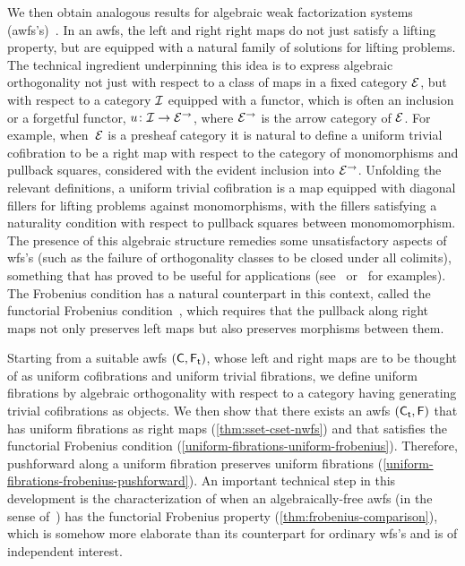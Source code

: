 \documentclass[reqno,10pt,a4paper,oneside,draft]{amsart}
\begin{document}
We then obtain analogous results for algebraic weak factorization systems (awfs's)~\cite{garner:small-object-argument,grandis-tholen-nwfs}.
In an awfs, the left and right right maps do not just satisfy a lifting property, but are equipped with a natural family of solutions for lifting problems.
The technical ingredient underpinning this idea is to express algebraic orthogonality not just with respect to a class of maps in a fixed category $\cal{E}$, but with respect to a category $\cal{I}$ equipped with a functor, which is often an inclusion or a forgetful functor, $u \co \cal{I} \to \cal{E}^\to$, where $\cal{E}^\to$ is the arrow category of $\cal{E}$.
For example, when~$\cal{E}$ is a presheaf category it is natural to define a uniform trivial cofibration to be a right map with respect to the category of monomorphisms and pullback squares, considered with the evident inclusion into $\cal{E}^\to$.
Unfolding the relevant definitions, a uniform trivial cofibration is a map equipped with diagonal fillers for lifting problems against monomorphisms, with the fillers satisfying a naturality condition with respect to pullback squares between monomomorphism.
The presence of this algebraic structure remedies some unsatisfactory aspects of wfs's (such as the failure of orthogonality classes to be closed under all colimits), something that has proved to be useful for applications (see~\cite{batanin-cisinski-weber,garner:globular-operator-awfs,garner-homomorphisms} or~\cite{awodey-cubical,coquand-cubical-sets,cohen-et-al:cubicaltt,pitts-cubical-nominal,swan-awfs} for examples).
The Frobenius condition has a natural counterpart in this context, called the functorial Frobenius condition~\cite{garner:topological-simplicial}, which requires that the pullback along right maps not only preserves left maps but also preserves morphisms between them.

Starting from a suitable awfs $(\CC, \TF)$, whose left and right maps are to be thought of as uniform cofibrations and uniform trivial fibrations, we define uniform fibrations by algebraic orthogonality with respect to a category having 
generating trivial cofibrations as objects.
We then show that there exists an awfs $(\TC, \FF)$ that has uniform fibrations as right maps (\cref{thm:sset-cset-nwfs}) and that satisfies the functorial Frobenius condition (\cref{uniform-fibrations-uniform-frobenius}).
Therefore, pushforward along a uniform fibration preserves uniform fibrations (\cref{uniform-fibrations-frobenius-pushforward}).
An important technical step in this development is the characterization of when an algebraically-free awfs (in the sense of~\cite{garner:small-object-argument}) has the functorial Frobenius property (\cref{thm:frobenius-comparison}), which is somehow more elaborate than its counterpart for ordinary wfs's and is of independent interest.
\end{document}
